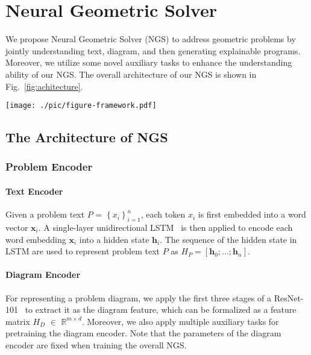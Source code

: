 \documentclass[11pt,a4paper]{article}
\begin{document}
\section{Neural Geometric Solver}
We propose Neural Geometric Solver (NGS) to address geometric problems by jointly understanding text, diagram, and then generating explainable programs. Moreover, we utilize some novel auxiliary tasks to enhance the understanding ability of our NGS.
The overall architecture of our NGS is shown in Fig.~\ref{fig:achitecture}. 





\begin{figure*}[t]
\begin{center}
 \texttt{[image: ./pic/figure-framework.pdf]}
\end{center}
  \caption{The overall architecture of our Neural Geometric Solver (left) in conjunction with auxiliary tasks (right). The problem text and diagram is encoded separately, then fed into a joint reasoning module together to obtain cross-modal fusion of text and diagram features. A decoder utilizes fused multimodal features to generate the interpretable programs. In addition, we propose three auxiliary tasks to enhance feature representation and facilitate multimodal reasoning.
}
\label{fig:achitecture}
\end{figure*}

\subsection{The Architecture of NGS}

\subsubsection{Problem Encoder}
\paragraph{Text Encoder}
Given a problem text $P$ = $\left \{ x_i \right \}^n_{i=1}$, each token $x_i$ is first embedded into a word vector $\mathbf{x}_i$. A single-layer unidirectional LSTM~\cite{LSTM} is then applied to encode each word embedding $\mathbf{x}_i$ into a hidden state $\mathbf{h}_i$. The sequence of the hidden state in LSTM are used to represent problem text $P$ as $H_P= [\mathbf{h}_0;...;\mathbf{h}_n]$.



\paragraph{Diagram Encoder}
For representing a problem diagram, we apply the first three stages of a ResNet-101~\cite{he2016deep}  to extract it as the diagram feature, which can be formalized as a feature matrix $H_D$ $\in$ $\mathbb{R}^{ m \times d }$.
Moreover, we also apply multiple auxiliary tasks for pretraining the diagram encoder.
Note that the parameters of the diagram encoder are fixed when training the overall NGS.
\end{document}
